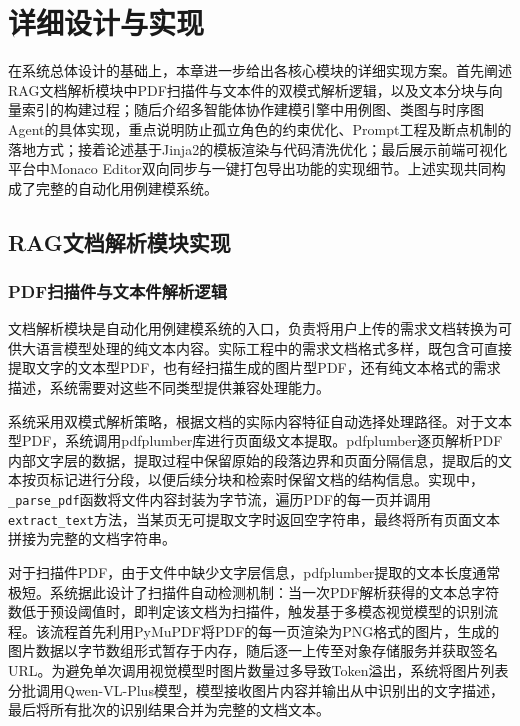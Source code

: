 \chapter{详细设计与实现}
\vspace{7pt}

在系统总体设计的基础上，本章进一步给出各核心模块的详细实现方案。首先阐述RAG文档解析模块中PDF扫描件与文本件的双模式解析逻辑，以及文本分块与向量索引的构建过程；随后介绍多智能体协作建模引擎中用例图、类图与时序图Agent的具体实现，重点说明防止孤立角色的约束优化、Prompt工程及断点机制的落地方式；接着论述基于Jinja2的模板渲染与代码清洗优化；最后展示前端可视化平台中Monaco Editor双向同步与一键打包导出功能的实现细节。上述实现共同构成了完整的自动化用例建模系统。

\section{RAG文档解析模块实现}

\subsection{PDF扫描件与文本件解析逻辑}

文档解析模块是自动化用例建模系统的入口，负责将用户上传的需求文档转换为可供大语言模型处理的纯文本内容。实际工程中的需求文档格式多样，既包含可直接提取文字的文本型PDF，也有经扫描生成的图片型PDF，还有纯文本格式的需求描述，系统需要对这些不同类型提供兼容处理能力。

系统采用双模式解析策略，根据文档的实际内容特征自动选择处理路径。对于文本型PDF，系统调用pdfplumber库进行页面级文本提取。pdfplumber逐页解析PDF内部文字层的数据，提取过程中保留原始的段落边界和页面分隔信息，提取后的文本按页标记进行分段，以便后续分块和检索时保留文档的结构信息。实现中，\texttt{\_parse\_pdf}函数将文件内容封装为字节流，遍历PDF的每一页并调用\texttt{extract\_text}方法，当某页无可提取文字时返回空字符串，最终将所有页面文本拼接为完整的文档字符串。

对于扫描件PDF，由于文件中缺少文字层信息，pdfplumber提取的文本长度通常极短。系统据此设计了扫描件自动检测机制：当一次PDF解析获得的文本总字符数低于预设阈值时，即判定该文档为扫描件，触发基于多模态视觉模型的识别流程。该流程首先利用PyMuPDF将PDF的每一页渲染为PNG格式的图片，生成的图片数据以字节数组形式暂存于内存，随后逐一上传至对象存储服务并获取签名URL。为避免单次调用视觉模型时图片数量过多导致Token溢出，系统将图片列表分批调用Qwen-VL-Plus模型，模型接收图片内容并输出从中识别出的文字描述，最后将所有批次的识别结果合并为完整的文档文本。

